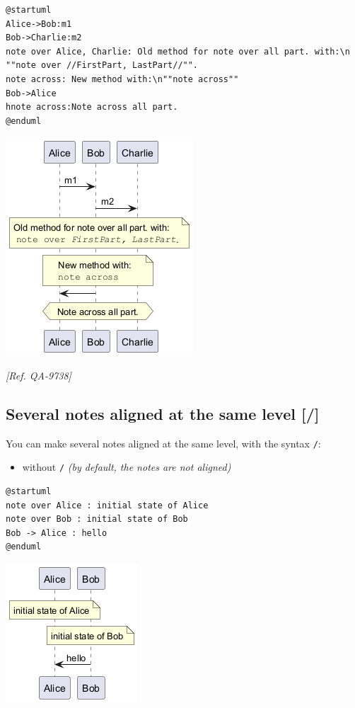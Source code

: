 \begin{verbatim}
@startuml
Alice->Bob:m1
Bob->Charlie:m2
note over Alice, Charlie: Old method for note over all part. with:\n ""note over //FirstPart, LastPart//"".
note across: New method with:\n""note across""
Bob->Alice
hnote across:Note across all part.
@enduml
\end{verbatim}
\begin{center}
\includegraphics[scale=0.60]{imgw/img-06ba9ed80c25750c91cf7f5ebad81434.png}
\end{center}


\textit{[Ref. QA-9738]}
%
%
\subsection{Several notes aligned at the same level [/]}


You can make several notes aligned at the same level, with the syntax \texttt{/}:
\begin{itemize}
\item without \texttt{/} \textit{(by default, the notes are not aligned)}
\end{itemize}
\begin{verbatim}
@startuml
note over Alice : initial state of Alice
note over Bob : initial state of Bob
Bob -> Alice : hello
@enduml
\end{verbatim}
\begin{center}
\includegraphics[scale=0.60]{imgw/img-2d20b688283815c9941a1434b59d956d.png}
\end{center}


